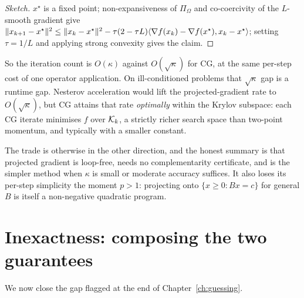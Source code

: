 \begin{proof}[Sketch]
$x^\star$ is a fixed point; non-expansiveness of $\Pi_\Omega$ and co-coercivity of
the $L$-smooth gradient give
$\lVert x_{k+1}-x^\star \rVert^2 \le \lVert x_k-x^\star \rVert^2 -
\tau(2-\tau L)\langle \nabla f(x_k)-\nabla f(x^\star), x_k-x^\star \rangle$; setting
$\tau = 1/L$ and applying strong convexity gives the claim.
\end{proof}

So the iteration count is $O(\kappa)$ against $O(\sqrt\kappa)$ for CG, at the same
per-step cost of one operator application. On ill-conditioned problems that
$\sqrt\kappa$ gap is a runtime gap. Nesterov acceleration \cite{nesterov2004,beck2009}
would lift the projected-gradient rate to $O(\sqrt\kappa)$, but CG attains that rate
\emph{optimally} within the Krylov subspace: each CG iterate minimises $f$ over
$\mathcal{K}_k$, a strictly richer search space than two-point momentum, and typically
with a smaller constant.

The trade is otherwise in the other direction, and the honest summary is that
projected gradient is loop-free, needs no complementarity certificate, and is the
simpler method when $\kappa$ is small or moderate accuracy suffices. It also loses
its per-step simplicity the moment $p > 1$: projecting onto
$\{x\ge0 : Bx=c\}$ for general $B$ is itself a non-negative quadratic program.

\section{Inexactness: composing the two guarantees}
\label{sec:inexact}

We now close the gap flagged at the end of Chapter~\ref{ch:guessing}.

